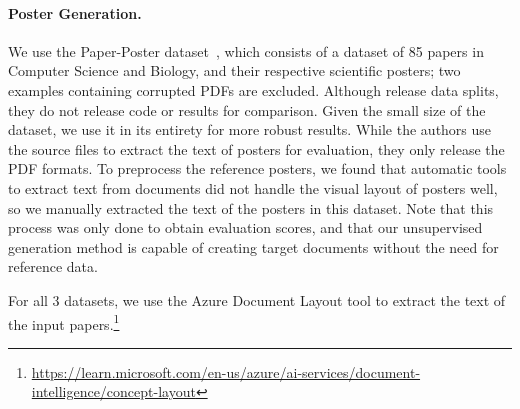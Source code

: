
\paragraph{Poster Generation.} We use the Paper-Poster dataset~\cite{Qiang2016LearningTG}, which consists of a dataset of 85 papers in Computer Science and Biology, and their respective scientific posters; two examples containing corrupted PDFs are excluded. Although \textcite{Qiang2016LearningTG} release data splits, they do not release code or results for comparison. Given the small size of the dataset, we use it in its entirety for more robust results. While the authors use the source files to extract the text of posters for evaluation, they only release the PDF formats. To preprocess the reference posters, we found that automatic tools to extract text from documents did not handle the visual layout of posters well, so we manually extracted the text of the posters in this dataset. Note that this process was only done to obtain evaluation scores, and that our unsupervised generation method is capable of creating target documents without the need for reference data.%


For all 3 datasets, we use the Azure Document Layout tool to extract the text of the input papers.\footnote{\scriptsize \url{https://learn.microsoft.com/en-us/azure/ai-services/document-intelligence/concept-layout}}






